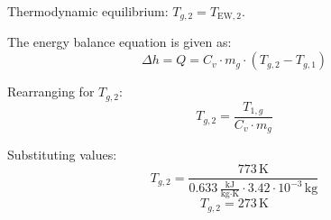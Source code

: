 Thermodynamic equilibrium: \( T_{g,2} = T_{\text{EW},2} \).  

The energy balance equation is given as:  
\[
\Delta h = Q = C_v \cdot m_g \cdot (T_{g,2} - T_{g,1})
\]  

Rearranging for \( T_{g,2} \):  
\[
T_{g,2} = \frac{T_{1,g}}{C_v \cdot m_g}
\]  

Substituting values:  
\[
T_{g,2} = \frac{773 \, \text{K}}{0.633 \, \frac{\text{kJ}}{\text{kg·K}} \cdot 3.42 \cdot 10^{-3} \, \text{kg}}
\]  
\[
T_{g,2} = 273 \, \text{K}
\]